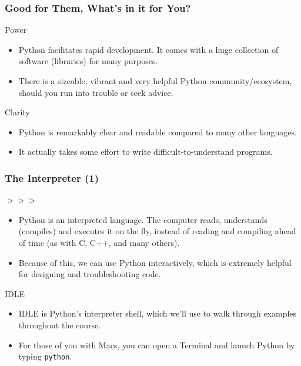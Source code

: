 \documentclass[10pt]{beamer}
\begin{document}
\begin{frame}
  \frametitle{Good for Them, What's in it for You?}
  \begin{block}{Power}
    \begin{itemize}
      \item Python facilitates rapid development.
        It comes with a huge collection of software (libraries) for many purposes.
      \item There is a sizeable, vibrant and very helpful Python community/ecosystem, should you run into trouble or seek advice.
    \end{itemize}
  \end{block}
  \begin{block}{Clarity}
    \begin{itemize}
      \item Python is remarkably clear and readable compared to many other languages.
      \item It actually takes some effort to write difficult-to-understand programs.
    \end{itemize}
  \end{block}
\end{frame}

\begin{frame}
  \frametitle{The Interpreter (1)}
  \begin{block}{$>>>$}
    \begin{itemize}
      \item Python is an interpreted language.
        The computer reads, understands (compiles) and executes it on the fly, instead of reading and compiling ahead of time (as with C, C++, and many others).
      \item Because of this, we can use Python interactively, which is extremely helpful for designing and troubleshooting code.
    \end{itemize}
  \end{block}
  \begin{block}{IDLE}
    \begin{itemize}
      \item IDLE is Python's interpreter shell, which we'll use to walk through examples throughout the course.
      \item For those of you with Macs, you can open a Terminal and launch Python by typing \texttt{python}.
    \end{itemize}
  \end{block}
\end{frame}
\end{document}
